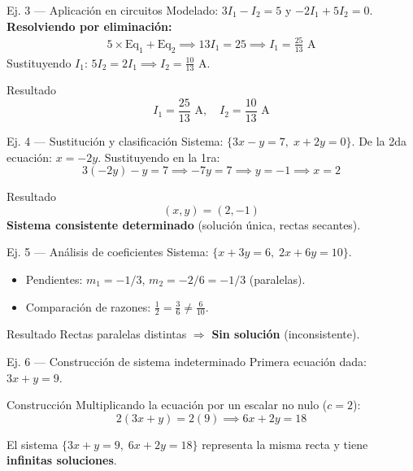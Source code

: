 \documentclass[11pt]{beamer}
\begin{document}
\begin{frame}{Ej. 3 — Aplicación en circuitos}
  Modelado: $3I_1 - I_2 = 5$ y $-2I_1 + 5I_2 = 0$.
  \vfill
  \textbf{Resolviendo por eliminación:}
  \begin{align*}
    5 \times \text{Eq}_1 + \text{Eq}_2 \implies 13I_1 = 25 \implies I_1 = \frac{25}{13} \text{ A}
  \end{align*}
  Sustituyendo $I_1$: $5I_2 = 2I_1 \implies I_2 = \frac{10}{13} \text{ A}$.
  \vfill
  \begin{block}{Resultado}
    \[ \boxed{I_1 = \frac{25}{13}\text{ A}, \quad I_2 = \frac{10}{13}\text{ A}} \]
  \end{block}
\end{frame}

\begin{frame}{Ej. 4 — Sustitución y clasificación}
  Sistema: $\{3x-y=7,\; x+2y=0\}$.
  \vfill
  De la 2da ecuación: $x = -2y$. Sustituyendo en la 1ra:
  \[
    3(-2y) - y = 7 \implies -7y = 7 \implies y = -1 \implies x = 2
  \]
  \vfill
  \begin{block}{Resultado}
    \[ \boxed{(x,y) = (2,-1)} \]
    \textbf{Sistema consistente determinado} (solución única, rectas secantes).
  \end{block}
\end{frame}

\begin{frame}{Ej. 5 — Análisis de coeficientes}
  Sistema: $\{x+3y=6,\; 2x+6y=10\}$.
  \vfill
  \begin{itemize}
    \item Pendientes: $m_1 = -1/3$, $m_2 = -2/6 = -1/3$ (paralelas).
    \item Comparación de razones: $\frac{1}{2} = \frac{3}{6} \neq \frac{6}{10}$.
  \end{itemize}
  \vfill
  \begin{alertblock}{Resultado}
    Rectas paralelas distintas $\Rightarrow$ \textbf{Sin solución} (inconsistente).
  \end{alertblock}
\end{frame}

\begin{frame}{Ej. 6 — Construcción de sistema indeterminado}
  Primera ecuación dada: $3x + y = 9$.
  \vfill
  \begin{block}{Construcción}
    Multiplicando la ecuación por un escalar no nulo ($c = 2$):
    \[
      2(3x + y) = 2(9) \implies 6x + 2y = 18
    \]
  \end{block}
  \vfill
  El sistema $\{3x+y=9,\; 6x+2y=18\}$ representa la misma recta y tiene \textbf{infinitas soluciones}.
\end{frame}
\end{document}
